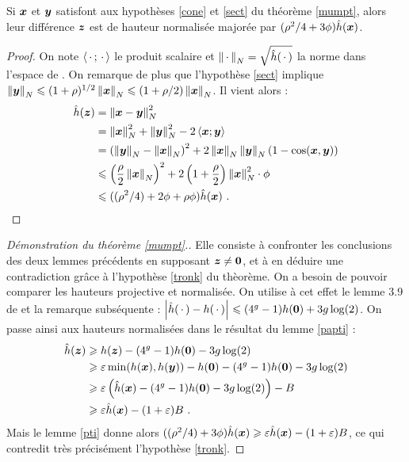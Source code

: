 \begin{lem} \label{pti}
  Si $\p{x}$ et $\p{y}$ satisfont aux hypothèses \ref{cone} et \ref{sect} du
  théorème \ref{mumpt}, alors leur différence $\p{z}$ est de hauteur
  normalisée majorée par $(\rho^2/4 + 3\phi) \hn(\p{x})$.
\end{lem}

\begin{proof}
  On note $\left<\truc ; \truc \right>$ le produit scalaire et $\nv[N]{\truc} =
  \sqrt{\hn(\truc)}$ la norme dans l'espace de . On remarque
  de plus que l'hypothèse \ref{sect} implique $\nv[N]{\p{y}} \le
  (1+\rho)^{1/2}\nv[N]{\p{x}} \le (1+\rho/2) \nv[N]{\p{x}}$. Il vient alors :
  \begin{align*}
  \hn(\p{z}) & = \nv[N]{\p{x}-\p{y}}^2 \\ & = \nv[N]{\p{x}}^2 +
  \nv[N]{\p{y}}^2 - 2\left< \p{x} ; \p{y} \right> \\
  & = \left(\nv[N]{\p{y}} - \nv[N]{\p{x}}\right)^2 +
  2\nv[N]{\p{x}}\nv[N]{\p{y}}\left( 1- \cos(\p{x}, \p{y}) \right) \\
  & \le \left( \frac{\rho}{2}\nv[N]{\p{x}} \right)^2 + 2\left(
  1+\frac{\rho}{2} \right) \nv[N]{\p{x}}^2 \cdot \phi \\
  & \le ((\rho^2/4) + 2\phi + \rho\phi) \hn(\p{x})\pmm{.}\qedhere
  \end{align*}
\end{proof}

\begin{proof}[Démonstration du théorème \ref{mumpt}.]
  Elle consiste à confronter les conclusions des deux lemmes précédents en
  supposant $\p{z} \neq \OA$, et à en déduire une contradiction grâce à
  l'hypothèse \ref{tronk} du thèorème. On a besoin de pouvoir comparer les
  hauteurs projective et normalisée. On utilise à cet effet le lemme 3.9 de
  \cite{daphiminvaii} et la remarque subséquente : $\av[]{\hn(\truc) -
    h(\truc)} \le (4^g-1)h(\OA) + 3g\log(2)$. On passe ainsi aux hauteurs
  normalisées dans le résultat du lemme \ref{papti} :
  \begin{align*}
  \hn(\p{z}) & \ge h(\p{z}) - (4^g-1)h(\OA) - 3g\log(2)\\
  & \ge \eps \min(h(\p{x}), h(\p{y})) - h(\OA) - (4^g-1)h(\OA) - 3g\log(2)
  \\
  & \ge \eps \left(\hn(\p{x}) - (4^g-1)h(\OA) - 3g\log(2)\right) - B \\
  & \ge \eps \hn(\p{x}) - (1+\eps)B \pmm{.}
  \end{align*}
  Mais le lemme \ref{pti} donne alors $((\rho^2/4) + 3\phi) \hn(\p{x}) \ge
  \eps \hn(\p{x}) - (1+\eps)B$, ce qui contredit très précisément l'hypothèse
  \ref{tronk}.
\end{proof}

\printbibliography


